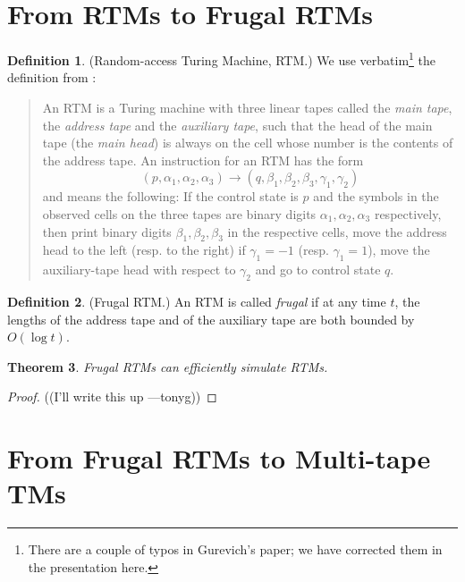\documentclass[english]{article}
\theoremstyle{plain}
\newtheorem{thm}{Theorem}
\theoremstyle{definition}
\newtheorem{defn}[thm]{Definition}
\theoremstyle{plain}
\begin{document}
\section{From RTMs to Frugal RTMs}

\begin{defn}
  (Random-access Turing Machine, RTM.) We use verbatim\footnote{There
    are a couple of typos in Gurevich's paper; we have corrected them
    in the presentation here.} the definition from
  \cite{DBLP:conf/ershov/GurevichS89}:

  \begin{quote}
    An RTM is a Turing machine with three linear tapes called the
    \emph{main tape}, the \emph{address tape} and the \emph{auxiliary
      tape}, such that the head of the main tape (the \emph{main
      head}) is always on the cell whose number is the contents of the
    address tape. An instruction for an RTM has the form
    \begin{equation*}
      (p,\alpha_1,\alpha_2,\alpha_3) \rightarrow
      (q,\beta_1,\beta_2,\beta_3,\gamma_1,\gamma_2)
    \end{equation*}
    and means the following: If the control state is $p$ and the
    symbols in the observed cells on the three tapes are binary digits
    $\alpha_1,\alpha_2,\alpha_3$ respectively, then print binary
    digits $\beta_1,\beta_2,\beta_3$ in the respective cells, move the
    address head to the left (resp. to the right) if $\gamma_1=-1$
    (resp. $\gamma_1=1$), move the auxiliary-tape head with respect
    to $\gamma_2$ and go to control state $q$.
  \end{quote}
\end{defn}

\begin{defn}
  (Frugal RTM.) An RTM is called \emph{frugal} if at any time $t$, the
  lengths of the address tape and of the auxiliary tape are both
  bounded by $O(\log t)$.
\end{defn}

\begin{thm}
  Frugal RTMs can efficiently simulate RTMs.
\end{thm}

\begin{proof}
  ((I'll write this up ---tonyg))
\end{proof}

\section{From Frugal RTMs to Multi-tape TMs}
\end{document}

